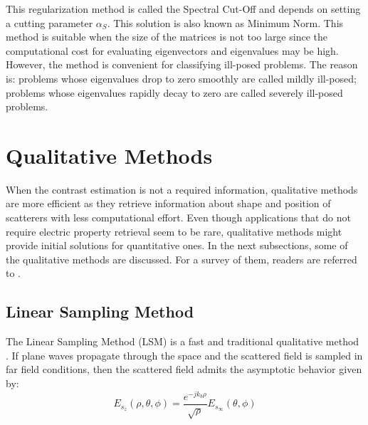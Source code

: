 			This regularization method is called the Spectral Cut-Off and depends on setting a cutting parameter $\alpha_{S}$. This solution is also known as Minimum Norm. This method is suitable when the size of the matrices is not too large since the computational cost for evaluating eigenvectors and eigenvalues may be high. However, the method is convenient for classifying ill-posed problems. The reason is: problems whose eigenvalues drop to zero smoothly are called mildly ill-posed; problems whose eigenvalues rapidly decay to zero are called severely ill-posed problems.
	
	\section{Qualitative Methods}\label{chap:methods:qualitative}
			
		When the contrast estimation is not a required information, qualitative methods are more efficient as they retrieve information about shape and position of scatterers with less computational effort. Even though applications that do not require electric property retrieval seem to be rare, qualitative methods might provide initial solutions for quantitative ones. In the next subsections, some of the qualitative methods are discussed. For a survey of them, readers are referred to \citep{potthast2006survey}.
		
		\subsection{Linear Sampling Method}\label{chap:methods:qualitative:lsm}
			
			The Linear Sampling Method (LSM) is a fast and traditional qualitative method \citep{colton2019inverse,colton1996simple}. If plane waves propagate through the space and the scattered field is sampled in far field conditions, then the scattered field admits the asymptotic behavior given by:
			\begin{equation}
				E_{s_z}(\rho, \theta, \phi) = \frac{e^{-jk_b\rho}}{\sqrt{\rho}}E_{s_\infty}(\theta, \phi) \label{eq:3:qualitative:lsm:kernel}
			\end{equation}
		
